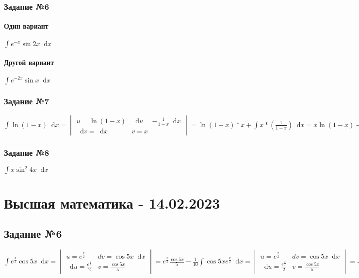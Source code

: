 \documentclass{article}
\newcommand*\diff{\mathop{}\!\mathrm{d}}
\begin{document}
\subsubsection{Задание №6}

\paragraph{Один вариант}

$
\int e^{-x} \sin 2 x \diff x
$

\paragraph{Другой вариант}

$
\int e^{- 2 x} \sin x \diff x 
$

\subsubsection{Задание №7}

$
\int \ln (1 - x) \diff x = \begin{vmatrix}
    u = \ln (1 - x) & \diff u = - \frac{1}{1 - x} \diff x \\
    \diff v = \diff x & v = x
\end{vmatrix} = \ln (1 - x) * x + \int x * (\frac{1}{1 - x}) \diff x = x \ln (1 - x) - \int \frac{-x}{1 - x} \diff x = x \ln (1 - x) - \int \frac{1 - x + 1}{1 - x} \diff x = x \ln (1 - x) - \int \frac{1 - x}{1 - x} * x + \int \frac{\diff x}{-1 + x} = x \ln (1 - x) - x + \ln |x - 1| + C
$

\subsubsection{Задание №8}

$\int x \sin^2 4x \diff x$

\pagebreak
\section{Высшая математика - 14.02.2023}

\subsection{Задание №6}

$\int e^{\frac{x}{2}} \cos 5 x \diff x = \begin{vmatrix}
    u = e^{\frac{x}{2}} & dv = \cos 5 x \diff x \\
    \diff u = \frac{e^{\frac{x}{2}}}{2} & v = \frac{\cos 5 x}{5}
\end{vmatrix} = e^{\frac{x}{2}} \frac{\cos 5 x}{5} - \frac{1}{10} \int \cos 5 x e^{\frac{x}{2}} \diff x = \begin{vmatrix}
    u = e^{\frac{x}{2}} & dv = \cos 5 x \diff x \\
    \diff u = \frac{e^{\frac{x}{2}}}{2} & v = \frac{\cos 5 x}{5}
\end{vmatrix} = \frac{\cos 5 x}{5} - \frac{1}{10} (\frac{e^{\frac{x}{2}} \cos 5 x}{5} - \frac{1}{10} \int \cos 5 x e^{\frac{x}{2}} \diff x) = \frac{\cos 5 x}{5} - \frac{e^{\frac{x}{2}} \cos 5 x}{50} + \frac{1}{100} \int \cos 5 x e^{\frac{x}{2}} \diff x$
\end{document}
